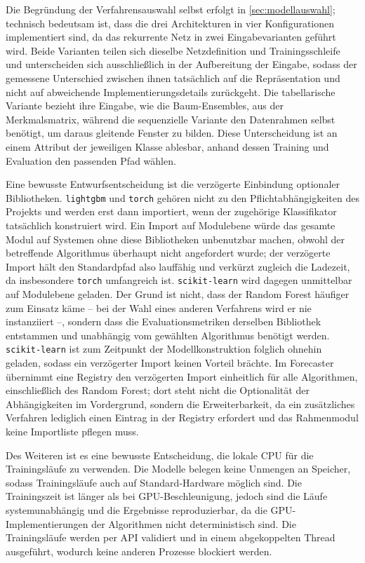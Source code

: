 Die Begründung der Verfahrensauswahl selbst erfolgt in \cref{sec:modellauswahl}; technisch bedeutsam ist, dass die drei Architekturen in vier Konfigurationen implementiert sind, da das rekurrente Netz in zwei Eingabevarianten geführt wird. Beide Varianten teilen sich dieselbe Netzdefinition und Trainingsschleife und unterscheiden sich ausschließlich in der Aufbereitung der Eingabe, sodass der gemessene Unterschied zwischen ihnen tatsächlich auf die Repräsentation und nicht auf abweichende Implementierungsdetails zurückgeht. Die tabellarische Variante bezieht ihre Eingabe, wie die Baum-Ensembles, aus der Merkmalsmatrix, während die sequenzielle Variante den Datenrahmen selbst benötigt, um daraus gleitende Fenster zu bilden. Diese Unterscheidung ist an einem Attribut der jeweiligen Klasse ablesbar, anhand dessen Training und Evaluation den passenden Pfad wählen.

Eine bewusste Entwurfsentscheidung ist die verzögerte Einbindung optionaler Bibliotheken. \texttt{lightgbm} und \texttt{torch} gehören nicht zu den Pflichtabhängigkeiten des Projekts und werden erst dann importiert, wenn der zugehörige Klassifikator tatsächlich konstruiert wird. Ein Import auf Modulebene würde das gesamte Modul auf Systemen ohne diese Bibliotheken unbenutzbar machen, obwohl der betreffende Algorithmus überhaupt nicht angefordert wurde; der verzögerte Import hält den Standardpfad also lauffähig und verkürzt zugleich die Ladezeit, da insbesondere \texttt{torch} umfangreich ist. \texttt{scikit-learn} wird dagegen unmittelbar auf Modulebene geladen. Der Grund ist nicht, dass der Random Forest häufiger zum Einsatz käme -- bei der Wahl eines anderen Verfahrens wird er nie instanziiert --, sondern dass die Evaluationsmetriken derselben Bibliothek entstammen und unabhängig vom gewählten Algorithmus benötigt werden. \texttt{scikit-learn} ist zum Zeitpunkt der Modellkonstruktion folglich ohnehin geladen, sodass ein verzögerter Import keinen Vorteil brächte. Im Forecaster übernimmt eine Registry den verzögerten Import einheitlich für alle Algorithmen, einschließlich des Random Forest; dort steht nicht die Optionalität der Abhängigkeiten im Vordergrund, sondern die Erweiterbarkeit, da ein zusätzliches Verfahren lediglich einen Eintrag in der Registry erfordert und das Rahmenmodul keine Importliste pflegen muss.

Des Weiteren ist es eine bewusste Entscheidung, die lokale CPU für die Trainingsläufe zu verwenden. Die Modelle belegen keine Unmengen an Speicher, sodass Trainingsläufe auch auf Standard-Hardware möglich sind. Die Trainingszeit ist länger als bei GPU-Beschleunigung, jedoch sind die Läufe systemunabhängig und die Ergebnisse reproduzierbar, da die GPU-Implementierungen der Algorithmen nicht deterministisch sind. Die Trainingsläufe werden per API validiert und in einem abgekoppelten Thread ausgeführt, wodurch keine anderen Prozesse blockiert werden.


